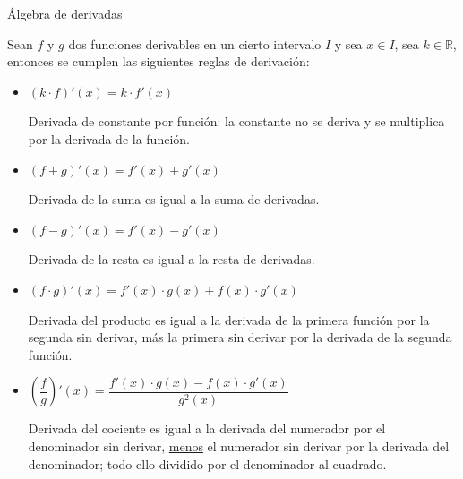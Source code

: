	\begin{teor}Álgebra de derivadas
	\label{teor:algebra-derivadas}
	
	Sean $f$ y $g$ dos funciones derivables en un cierto intervalo $I$ y sea $x\in I$, sea $k\in \mathbb R$, entonces se cumplen las siguientes reglas de derivación:
	
	\begin{itemize}
		\item $(k\cdot f)'(x)=k\cdot f'(x)$
		
		Derivada de constante por función: la constante no se deriva y se multiplica por la derivada de la función.
		
		\item $(f+g)'(x)=f'(x)+g'(x)$
		
		Derivada de la suma es igual a la suma de derivadas.
		
		\item $(f-g)'(x)=f'(x)-g'(x)$
		
		Derivada de la resta es igual a la resta de derivadas.
		
		\item $(f\cdot g)'(x)=f'(x)\cdot g(x)+f(x)\cdot g'(x)$
		
		Derivada del producto es igual a la derivada de la primera función por la segunda sin derivar, más la primera sin derivar por la derivada de la segunda función.
		
		\item $\left( \dfrac f g \right)'(x)=\dfrac {f'(x)\cdot g(x) - f(x)\cdot g'(x)}{g^2(x)}$
		
		Derivada del cociente es igual a la derivada del numerador por el denominador sin derivar, \underline{menos} el numerador sin derivar por la derivada del denominador; todo ello dividido por el denominador al cuadrado.

	\end{itemize}
	
			
	\end{teor}
	
